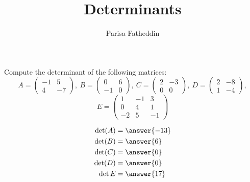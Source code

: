 \documentclass{ximera}
\author{Parisa Fatheddin}
\title{Determinants}
\begin{document}
\begin{abstract}
\end{abstract}
\maketitle

\begin{center}
\end{center}
\begin{exercise}
Compute the determinant of the following matrices:
\[
A=
\begin{pmatrix}
-1 & 5\\
4 & -7
\end{pmatrix},\  B = \begin{pmatrix} 0 & 6\\
-1 & 0
\end{pmatrix},\ C= \begin{pmatrix} 2 & -3 \\
0 & 0
\end{pmatrix},\ D = \begin{pmatrix} 2 & -8 \\
1 & -4
\end{pmatrix},
\]
\[
E = \begin{pmatrix}
1 & -1 & 3\\
0 & 4 & 1\\
-2 & 5 & -1
\end{pmatrix}
\]
\begin{prompt}
\begin{align*}
\det(A) &= \answer{-13}\\
\det(B) &= \answer{6}\\
\det(C) &= \answer{0}\\
\det(D) &= \answer{0}\\
\det{E} &= \answer{17}
\end{align*}
\end{prompt}
\end{exercise}
\end{document}
